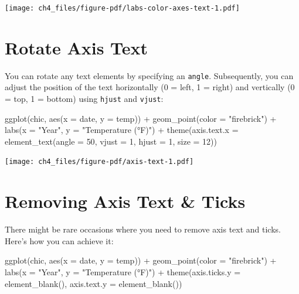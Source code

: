 \documentclass[
  letterpaper,
]{scrbook}
\newenvironment{Shaded}{\begin{snugshade}}{\end{snugshade}}
\newcommand{\AttributeTok}[1]{\textcolor[rgb]{0.40,0.45,0.13}{#1}}
\newcommand{\DecValTok}[1]{\textcolor[rgb]{0.68,0.00,0.00}{#1}}
\newcommand{\FunctionTok}[1]{\textcolor[rgb]{0.28,0.35,0.67}{#1}}
\newcommand{\NormalTok}[1]{\textcolor[rgb]{0.00,0.23,0.31}{#1}}
\newcommand{\SpecialCharTok}[1]{\textcolor[rgb]{0.37,0.37,0.37}{#1}}
\newcommand{\StringTok}[1]{\textcolor[rgb]{0.13,0.47,0.30}{#1}}
\begin{document}
\texttt{[image: ch4\_files/figure-pdf/labs-color-axes-text-1.pdf]}

\section{Rotate Axis Text}\label{rotate-axis-text}

You can rotate any text elements by specifying an \texttt{angle}.
Subsequently, you can adjust the position of the text horizontally (0 =
left, 1 = right) and vertically (0 = top, 1 = bottom) using
\texttt{hjust} and \texttt{vjust}:

\begin{Shaded}
\begin{Highlighting}[]
\FunctionTok{ggplot}\NormalTok{(chic, }\FunctionTok{aes}\NormalTok{(}\AttributeTok{x =}\NormalTok{ date, }\AttributeTok{y =}\NormalTok{ temp)) }\SpecialCharTok{+}
  \FunctionTok{geom\_point}\NormalTok{(}\AttributeTok{color =} \StringTok{"firebrick"}\NormalTok{) }\SpecialCharTok{+}
  \FunctionTok{labs}\NormalTok{(}\AttributeTok{x =} \StringTok{"Year"}\NormalTok{, }\AttributeTok{y =} \StringTok{"Temperature (°F)"}\NormalTok{) }\SpecialCharTok{+}
  \FunctionTok{theme}\NormalTok{(}\AttributeTok{axis.text.x =} \FunctionTok{element\_text}\NormalTok{(}\AttributeTok{angle =} \DecValTok{50}\NormalTok{, }\AttributeTok{vjust =} \DecValTok{1}\NormalTok{, }\AttributeTok{hjust =} \DecValTok{1}\NormalTok{, }\AttributeTok{size =} \DecValTok{12}\NormalTok{))}
\end{Highlighting}
\end{Shaded}

\texttt{[image: ch4\_files/figure-pdf/axis-text-1.pdf]}

\section{Removing Axis Text \& Ticks}\label{removing-axis-text-ticks}

There might be rare occasions where you need to remove axis text and
ticks. Here's how you can achieve it:

\begin{Shaded}
\begin{Highlighting}[]
\FunctionTok{ggplot}\NormalTok{(chic, }\FunctionTok{aes}\NormalTok{(}\AttributeTok{x =}\NormalTok{ date, }\AttributeTok{y =}\NormalTok{ temp)) }\SpecialCharTok{+}
  \FunctionTok{geom\_point}\NormalTok{(}\AttributeTok{color =} \StringTok{"firebrick"}\NormalTok{) }\SpecialCharTok{+}
  \FunctionTok{labs}\NormalTok{(}\AttributeTok{x =} \StringTok{"Year"}\NormalTok{, }\AttributeTok{y =} \StringTok{"Temperature (°F)"}\NormalTok{) }\SpecialCharTok{+}
  \FunctionTok{theme}\NormalTok{(}\AttributeTok{axis.ticks.y =} \FunctionTok{element\_blank}\NormalTok{(),}
        \AttributeTok{axis.text.y =} \FunctionTok{element\_blank}\NormalTok{())}
\end{Highlighting}
\end{Shaded}
\end{document}
